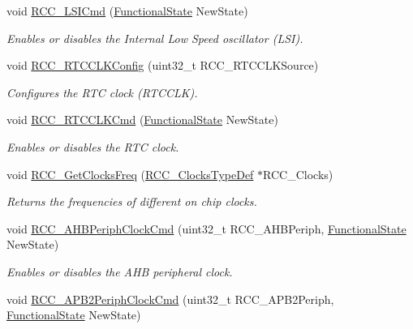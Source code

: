 \begin{DoxyCompactItemize}
void \mbox{\hyperlink{group___r_c_c___exported___functions_ga81e3ca29fd154ac2019bba6936d6d5ed}{R\+C\+C\+\_\+\+L\+S\+I\+Cmd}} (\mbox{\hyperlink{group___exported__types_gac9a7e9a35d2513ec15c3b537aaa4fba1}{Functional\+State}} New\+State)
\begin{DoxyCompactList}\small\item\em Enables or disables the Internal Low Speed oscillator (L\+SI). \end{DoxyCompactList}\item 
void \mbox{\hyperlink{group___r_c_c___exported___functions_ga1473d8a5a020642966359611c44181b0}{R\+C\+C\+\_\+\+R\+T\+C\+C\+L\+K\+Config}} (uint32\+\_\+t R\+C\+C\+\_\+\+R\+T\+C\+C\+L\+K\+Source)
\begin{DoxyCompactList}\small\item\em Configures the R\+TC clock (R\+T\+C\+C\+LK). \end{DoxyCompactList}\item 
void \mbox{\hyperlink{group___r_c_c___exported___functions_ga9802f84846df2cea8e369234ed13b159}{R\+C\+C\+\_\+\+R\+T\+C\+C\+L\+K\+Cmd}} (\mbox{\hyperlink{group___exported__types_gac9a7e9a35d2513ec15c3b537aaa4fba1}{Functional\+State}} New\+State)
\begin{DoxyCompactList}\small\item\em Enables or disables the R\+TC clock. \end{DoxyCompactList}\item 
void \mbox{\hyperlink{group___r_c_c___exported___functions_ga3e9944fd1ed734275222bbb3e3f29993}{R\+C\+C\+\_\+\+Get\+Clocks\+Freq}} (\mbox{\hyperlink{struct_r_c_c___clocks_type_def}{R\+C\+C\+\_\+\+Clocks\+Type\+Def}} $\ast$R\+C\+C\+\_\+\+Clocks)
\begin{DoxyCompactList}\small\item\em Returns the frequencies of different on chip clocks. \end{DoxyCompactList}\item 
void \mbox{\hyperlink{group___r_c_c___exported___functions_gae0b30d8598b8393bdba9c3fefba3a968}{R\+C\+C\+\_\+\+A\+H\+B\+Periph\+Clock\+Cmd}} (uint32\+\_\+t R\+C\+C\+\_\+\+A\+H\+B\+Periph, \mbox{\hyperlink{group___exported__types_gac9a7e9a35d2513ec15c3b537aaa4fba1}{Functional\+State}} New\+State)
\begin{DoxyCompactList}\small\item\em Enables or disables the A\+HB peripheral clock. \end{DoxyCompactList}\item 
void \mbox{\hyperlink{group___r_c_c___exported___functions_ga56ff55caf8d835351916b40dd030bc87}{R\+C\+C\+\_\+\+A\+P\+B2\+Periph\+Clock\+Cmd}} (uint32\+\_\+t R\+C\+C\+\_\+\+A\+P\+B2\+Periph, \mbox{\hyperlink{group___exported__types_gac9a7e9a35d2513ec15c3b537aaa4fba1}{Functional\+State}} New\+State)

\end{DoxyCompactItemize}
